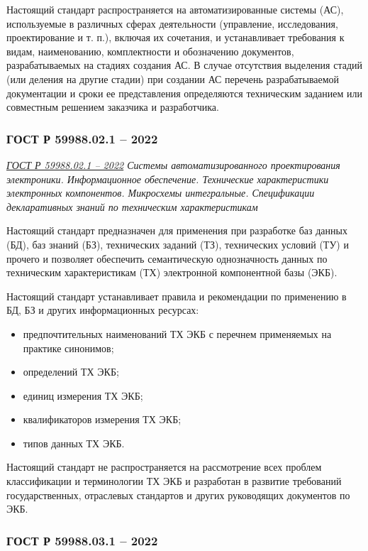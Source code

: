 Настоящий стандарт распространяется на автоматизированные системы (АС),
используемые в различных сферах деятельности
(управление, исследования, проектирование и т. п.), включая их сочетания,
и устанавливает требования к видам, наименованию,
комплектности и обозначению документов, разрабатываемых на стадиях создания АС.
В случае отсутствия выделения стадий (или деления на другие стадии)
при создании АС перечень разрабатываемой документации
и сроки ее представления определяются техническим заданием
или совместным решением заказчика и разработчика.

\subsubsection{ГОСТ Р 59988.02.1 -- 2022}

\emph{\href{https://docs.cntd.ru/document/1200192137}{ГОСТ Р 59988.02.1 -- 2022}
Системы автоматизированного проектирования электроники.
Информационное обеспечение.
Технические характеристики электронных компонентов.
Микросхемы интегральные.
Спецификации декларативных знаний по техническим характеристикам
}

Настоящий стандарт предназначен для применения при разработке
баз данных (БД), баз знаний (БЗ), технических заданий (ТЗ),
технических условий (ТУ) и прочего
и позволяет обеспечить семантическую однозначность данных
по техническим характеристикам (ТХ) электронной компонентной базы (ЭКБ).

Настоящий стандарт устанавливает правила и рекомендации
по применению в БД, БЗ и других информационных ресурсах:

\begin{itemize}
	\item предпочтительных наименований ТХ ЭКБ
		с перечнем применяемых на практике синонимов;
	\item определений ТХ ЭКБ;
	\item единиц измерения ТХ ЭКБ;
	\item квалификаторов измерения ТХ ЭКБ;
	\item типов данных ТХ ЭКБ.
\end{itemize}

Настоящий стандарт не распространяется на рассмотрение
всех проблем классификации и терминологии ТХ ЭКБ
и разработан в развитие требований государственных,
отраслевых стандартов и других руководящих документов по ЭКБ.

\subsubsection{ГОСТ Р 59988.03.1 -- 2022}

